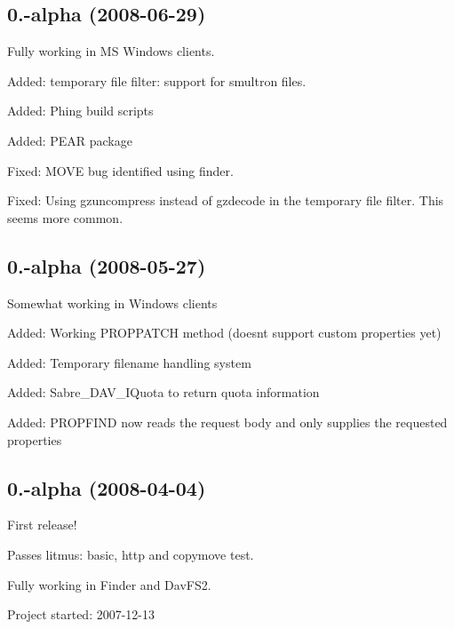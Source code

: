 \subsection*{0.-\/alpha (2008-\/06-\/29) }


\begin{DoxyItemize}
\item Fully working in MS Windows clients.
\item Added\+: temporary file filter\+: support for smultron files.
\item Added\+: Phing build scripts
\item Added\+: P\+E\+AR package
\item Fixed\+: M\+O\+VE bug identified using finder.
\item Fixed\+: Using gzuncompress instead of gzdecode in the temporary file filter. This seems more common.
\end{DoxyItemize}

\subsection*{0.-\/alpha (2008-\/05-\/27) }


\begin{DoxyItemize}
\item Somewhat working in Windows clients
\item Added\+: Working P\+R\+O\+P\+P\+A\+T\+CH method (doesn\textquotesingle{}t support custom properties yet)
\item Added\+: Temporary filename handling system
\item Added\+: Sabre\+\_\+\+D\+A\+V\+\_\+\+I\+Quota to return quota information
\item Added\+: P\+R\+O\+P\+F\+I\+ND now reads the request body and only supplies the requested properties
\end{DoxyItemize}

\subsection*{0.-\/alpha (2008-\/04-\/04) }


\begin{DoxyItemize}
\item First release!
\item Passes litmus\+: basic, http and copymove test.
\item Fully working in Finder and Dav\+F\+S2.
\end{DoxyItemize}

Project started\+: 2007-\/12-\/13 